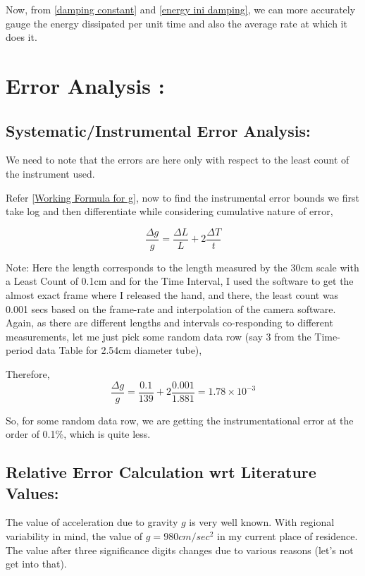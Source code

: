\documentclass[twocolumn,11pt]{article}
\begin{document}
Now, from \eqref{damping constant} and \eqref{energy ini damping}, we can more accurately gauge the energy dissipated per unit time and also the average rate at which it does it.

\section{Error Analysis :}
\subsection{Systematic/Instrumental Error Analysis:}

    We need to note that the errors are here only with respect to the least count of the instrument used.

    Refer \eqref{Working Formula for g}, now to find the instrumental error bounds we first take log and then differentiate while considering cumulative nature of error,

\begin{equation}
    \label{theoritical error expression}
    \frac{\Delta g}{g} = \frac{\Delta L}{L} + 2\frac{\Delta T}{t}
\end{equation}


Note: Here the length corresponds to the length measured by the 30cm scale with a Least Count of 0.1cm and for the Time Interval, I used the software to get the almost exact frame where I released the hand, and there, the least count was 0.001 secs based on the frame-rate and interpolation of the camera software.\\

Again, as there are different lengths and intervals co-responding to different measurements, let me just pick some random data row (say 3 from the Time-period data Table for 2.54cm diameter tube),

Therefore,
$$\frac{\Delta g}{g} = \frac{0.1}{139} + 2\frac{0.001}{1.881}=1.78 \times 10^{-3}$$

So, for some random data row, we are getting the instrumentational error at the order of 0.1\%, which is quite less.

    


\subsection{Relative Error Calculation wrt Literature Values:}
The value of acceleration due to gravity $g$ is very well known. With regional variability in mind, the value of $g=980cm/sec^2$ in my current place of residence. The value after three significance digits changes due to various reasons (let's not get into that).
\end{document}
